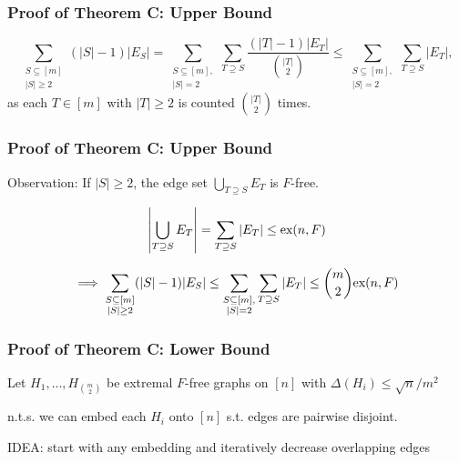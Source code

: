 \documentclass{beamer}
\newcommand*{\ex}{\textnormal{ex}}
\begin{document}
\begin{frame}

  \frametitle{Proof of Theorem C: Upper Bound}

  \[
    \sum_{\substack{S \subseteq [m] \\ |S| \geq 2}} (|S| - 1)|E_S| = \sum_{\substack{S \subseteq [m], \\ |S| = 2}} \sum_{T \supseteq S} \frac{(|T| - 1)|E_T|}{\binom{|T|}{2}} \leq \sum_{\substack{S \subseteq [m], \\ |S| = 2}} \sum_{T \supseteq S} |E_T|,
  \]
  as each $T \in [m]$ with $|T| \geq 2$ is counted $\binom{|T|}{2}$ times.
\end{frame}

\begin{frame}
  \frametitle{Proof of Theorem C: Upper Bound}

  Observation: If $|S| \geq 2$, the edge set $\bigcup_{T \supseteq S} E_T$ is $F$-free.

  \pause

  \vspace{0.3cm}

  \[
    \left|\bigcup_{T \supseteq S} E_T\right| = \sum_{T \supseteq S} |E_T| \leq \ex(n, F)
  \]
  \pause

  \vspace{0.3cm}

  \[
    \implies \sum_{\substack{S \subseteq [m] \\ |S| \geq 2}} (|S| - 1)|E_S| \leq \sum_{\substack{S \subseteq [m], \\ |S| = 2}} \sum_{T \supseteq S} |E_T| \leq \binom{m}{2}\ex(n, F)
  \]
\end{frame}

\begin{frame}
  \frametitle{Proof of Theorem C: Lower Bound}

  Let $H_1, \ldots, H_{\binom{m}{2}}$ be extremal $F$-free graphs on $[n]$ with $\Delta(H_i) \leq \sqrt{n}/m^2$

  \pause

  \vspace{0.7cm}

  n.t.s. we can embed each $H_i$ onto $[n]$ s.t. edges are pairwise disjoint.

  \pause

  \vspace{0.7cm}

  IDEA: start with any embedding and iteratively decrease overlapping edges
\end{frame}
\end{document}

